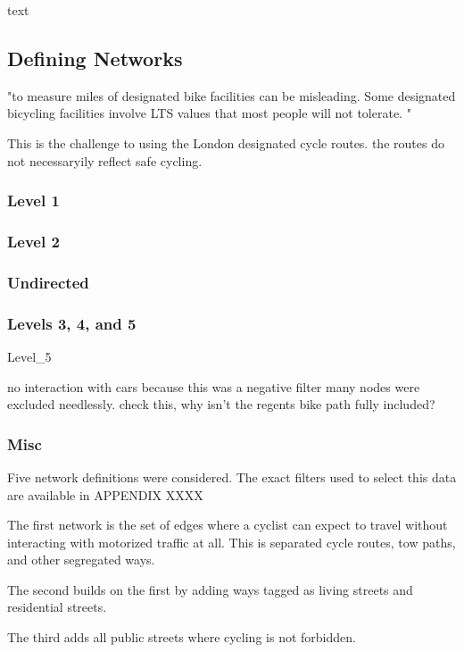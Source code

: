 text

\subsection{Defining Networks}

"to measure miles of designated bike facilities can be misleading. Some designated bicycling facilities involve LTS values that most people will not tolerate. "\cite{furth}

This is the challenge to using the London designated cycle routes. the routes do not necessaryily reflect safe cycling. 

\subsubsection{Level 1}

\subsubsection{Level 2}

\subsubsection{Undirected}

\subsubsection{Levels 3, 4, and 5}


Level\_5

no interaction with cars
because this was a negative filter many nodes were excluded needlessly. 
check this, why isn't the regents bike path fully included?


\subsubsection{Misc}

Five network definitions were considered. The exact filters used to select this data are available in APPENDIX XXXX 

The first network is the set of edges where a cyclist can expect to travel without interacting with motorized traffic at all. This is separated cycle routes, tow paths, and other segregated ways. 

The second builds on the first by adding ways tagged as living streets and residential streets.

The third adds all public streets where cycling is not forbidden. 

